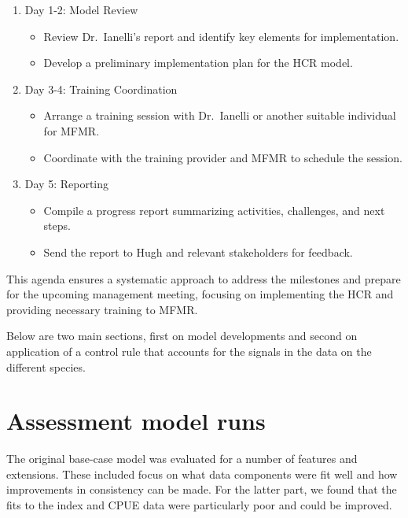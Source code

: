 \documentclass[
  letterpaper,
  DIV=11,
  numbers=noendperiod]{scrartcl}
\providecommand{\tightlist}{%
  \setlength{\itemsep}{0pt}\setlength{\parskip}{0pt}}\usepackage{longtable,booktabs,array}
\begin{document}
\begin{enumerate}
\def\labelenumi{\arabic{enumi}.}
\setcounter{enumi}{3}
\tightlist
\item
  Day 1-2: Model Review

  \begin{itemize}
  \tightlist
  \item
    Review Dr.~Ianelli's report and identify key elements for
    implementation.
  \item
    Develop a preliminary implementation plan for the HCR model.
  \end{itemize}
\item
  Day 3-4: Training Coordination

  \begin{itemize}
  \tightlist
  \item
    Arrange a training session with Dr.~Ianelli or another suitable
    individual for MFMR.
  \item
    Coordinate with the training provider and MFMR to schedule the
    session.
  \end{itemize}
\item
  Day 5: Reporting

  \begin{itemize}
  \tightlist
  \item
    Compile a progress report summarizing activities, challenges, and
    next steps.
  \item
    Send the report to Hugh and relevant stakeholders for feedback.
  \end{itemize}
\end{enumerate}

This agenda ensures a systematic approach to address the milestones and
prepare for the upcoming management meeting, focusing on implementing
the HCR and providing necessary training to MFMR.

Below are two main sections, first on model developments and second on
application of a control rule that accounts for the signals in the data
on the different species.

\section{Assessment model runs}\label{assessment-model-runs}

The original base-case model was evaluated for a number of features and
extensions. These included focus on what data components were fit well
and how improvements in consistency can be made. For the latter part, we
found that the fits to the index and CPUE data were particularly poor
and could be improved.
\end{document}
